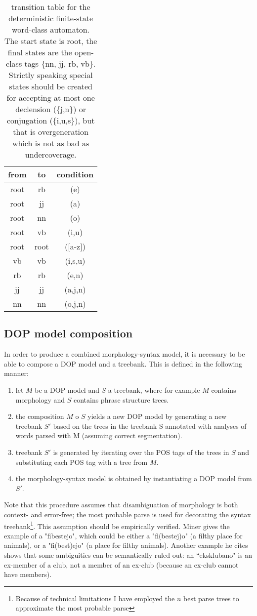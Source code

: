 \documentclass[10pt,a4paper]{article}
\begin{document}
\begin{table}
\begin{tabular}{ccc}
from & to & condition \\ \hline
root & rb & (e) \\
root & jj & (a) \\
root & nn & (o) \\
root & vb & ({i,u}) \\
root & root & ([a-z]) \\
vb & vb & ({i,s,u}) \\
rb & rb & ({e,n})  \\
jj & jj & ({a,j,n}) \\
nn & nn & ({o,j,n})
\end{tabular}
\caption{transition table for the deterministic finite-state word-class
automaton. The start state is root, the final states are the open-class tags
\{nn, jj, rb, vb\}. Strictly speaking special states should be created for
accepting at most one declension (\{j,n\}) or conjugation (\{i,u,s\}), but that
is overgeneration which is not as bad as undercoverage.}
\label{posfsa-tab}
\end{table}


\subsection{DOP model composition}

In order to produce a combined morphology-syntax model, it is necessary to be
able to compose a DOP model and a treebank. This is defined in the following
manner:

\begin{enumerate}
\item let $M$ be a DOP model and $S$ a treebank, where for example $M$ contains
      morphology and $S$ contains phrase structure trees.
\item the composition $M$ o $S$ yields a new DOP model by generating a new
      treebank $S'$ based on the trees in the treebank S annotated with
      analyses of words parsed with M (assuming correct segmentation).
\item treebank $S'$ is generated by iterating over the POS tags of the trees in
      $S$ and substituting each POS tag with a tree from $M$.
\item the morphology-syntax model is obtained by instantiating a DOP model from
      $S'$.
\end{enumerate}

Note that this procedure assumes that disambiguation of morphology is both
context- and error-free; the most probable parse is used for decorating the
syntax treebank\footnote{Because of technical limitations I have employed the
$n$ best parse trees to approximate the most probable parse}. This assumption
should be empirically verified. Miner gives the example of a "fibestejo", which
could be either a "fi(bestej)o" (a filthy place for animals), or a "fi(best)ejo"
(a place for filthy animals).  Another example he cites shows that some
ambiguities can be semantically ruled out: an ``eksklubano" is an ex-member of
a club, not a member of an ex-club (because an ex-club cannot have members).
\end{document}
